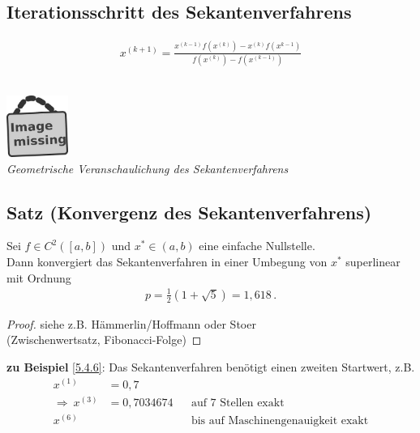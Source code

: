 \documentclass[ngerman,fontsize=11pt, paper=a4, parskip=half, titlepage=true, toc=bib]{scrbook}
\newcommand{\imagemissing}[1]{
	\begin{center}~\\
		\centering 
		\includegraphics[width=2cm]{images/image_missing.jpg}\\
		\textit{#1} \\
	\end{center}
}
\begin{document}
	
	\subsection{Iterationsschritt des Sekantenverfahrens}
		\begin{gather}
			x^{(k+1)} = \frac{x^{(k-1)}f(x^{(k)}) - x^{(k)}f(x^{k-1})}{f(x^{(k)})-f(x^{(k-1)})}
		\end{gather}
		
		\imagemissing{Geometrische Veranschaulichung des Sekantenverfahrens}
		
		
	\subsection{Satz (Konvergenz des Sekantenverfahrens)}
	Sei $f\in C^2([a,b])$ und $x^{*}\in (a,b)$ eine einfache Nullstelle.\\
	Dann konvergiert das Sekantenverfahren in einer Umbegung von $x^{*}$
	superlinear mit Ordnung 
	\begin{gather*}
		p=\frac{1}{2}(1+\sqrt{5})= 1,618 \, .
	\end{gather*}
	
	\begin{proof}
		siehe z.B. Hämmerlin/Hoffmann\cite{haemmerlinhoffmann}
		oder Stoer\cite{stoerbulirsch}\\
		(Zwischenwertsatz, Fibonacci-Folge)
	\end{proof}
	
	\textbf{zu Beispiel} \ref{5.4.6}: Das Sekantenverfahren benötigt
		einen zweiten Startwert, z.B.
		\begin{align*}
			x^{(1)}&=0,7 \\
			\Rightarrow ~ x^{(3)} &= 0,7034674 
				&&\text{auf 7 Stellen exakt}\\
			x^{(6)} &&& \text{bis auf Maschinengenauigkeit exakt}
		\end{align*}
		
		
\end{document}
